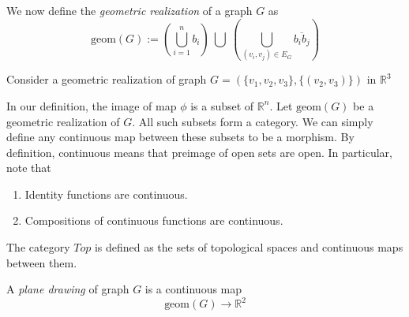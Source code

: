 \documentclass{article}
\def\geom{\text{geom}}
\begin{document}
\begin{definition}
We now define the \textit{geometric realization} of a graph $G$ as
\[
\geom(G) := \left( \bigcup_{i=1}^n b_i \right) \ \bigcup \ \left( \bigcup_{(v_i,v_j) \in E_G} \overline{b_i b_j} \right) 
\]
\end{definition}








\begin{example}
Consider a geometric realization of graph $G = (\{v_1, v_2, v_3\}, \{(v_2, v_3)\})$ in $\mathbb{R}^3$\\
\begin{center}
\end{center}
\end{example}

In our definition, the image of map $\phi$ is a subset of $\mathbb{R}^n$. Let $\geom(G)$ be a geometric realization of $G$. All such subsets form a category. We can simply define any continuous map between these subsets to be a morphism. By definition, continuous means that preimage of open sets are open. In particular, note that
\begin{enumerate}
    \item Identity functions are continuous.
    \item Compositions of continuous functions are continuous. 
\end{enumerate}
The category $Top$ is defined as the sets of topological spaces and continuous maps between them.

\begin{definition}
A \textit{plane drawing} of graph $G$ is a continuous map 
\begin{equation*}
    \geom(G) \to \mathbb{R}^2
\end{equation*}
\end{definition}
\end{document}
